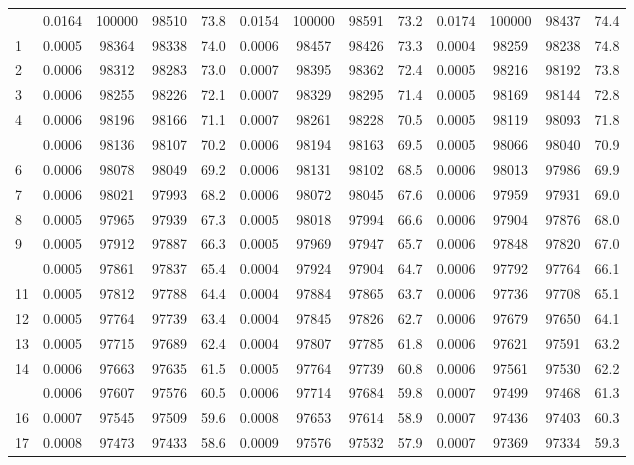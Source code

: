 \documentclass[
  14pt,
]{article}
\begin{document}
\begin{longtable}[t]{lcccccccccccc}
\endfoot
\bottomrule
\endlastfoot
0 & 0.0164 & 100000 & 98510 & 73.8 & 0.0154 & 100000 & 98591 & 73.2 & 0.0174 & 100000 & 98437 & 74.4\\
1 & 0.0005 & 98364 & 98338 & 74.0 & 0.0006 & 98457 & 98426 & 73.3 & 0.0004 & 98259 & 98238 & 74.8\\
2 & 0.0006 & 98312 & 98283 & 73.0 & 0.0007 & 98395 & 98362 & 72.4 & 0.0005 & 98216 & 98192 & 73.8\\
3 & 0.0006 & 98255 & 98226 & 72.1 & 0.0007 & 98329 & 98295 & 71.4 & 0.0005 & 98169 & 98144 & 72.8\\
4 & 0.0006 & 98196 & 98166 & 71.1 & 0.0007 & 98261 & 98228 & 70.5 & 0.0005 & 98119 & 98093 & 71.8\\
\addlinespace
5 & 0.0006 & 98136 & 98107 & 70.2 & 0.0006 & 98194 & 98163 & 69.5 & 0.0005 & 98066 & 98040 & 70.9\\
6 & 0.0006 & 98078 & 98049 & 69.2 & 0.0006 & 98131 & 98102 & 68.5 & 0.0006 & 98013 & 97986 & 69.9\\
7 & 0.0006 & 98021 & 97993 & 68.2 & 0.0006 & 98072 & 98045 & 67.6 & 0.0006 & 97959 & 97931 & 69.0\\
8 & 0.0005 & 97965 & 97939 & 67.3 & 0.0005 & 98018 & 97994 & 66.6 & 0.0006 & 97904 & 97876 & 68.0\\
9 & 0.0005 & 97912 & 97887 & 66.3 & 0.0005 & 97969 & 97947 & 65.7 & 0.0006 & 97848 & 97820 & 67.0\\
\addlinespace
10 & 0.0005 & 97861 & 97837 & 65.4 & 0.0004 & 97924 & 97904 & 64.7 & 0.0006 & 97792 & 97764 & 66.1\\
11 & 0.0005 & 97812 & 97788 & 64.4 & 0.0004 & 97884 & 97865 & 63.7 & 0.0006 & 97736 & 97708 & 65.1\\
12 & 0.0005 & 97764 & 97739 & 63.4 & 0.0004 & 97845 & 97826 & 62.7 & 0.0006 & 97679 & 97650 & 64.1\\
13 & 0.0005 & 97715 & 97689 & 62.4 & 0.0004 & 97807 & 97785 & 61.8 & 0.0006 & 97621 & 97591 & 63.2\\
14 & 0.0006 & 97663 & 97635 & 61.5 & 0.0005 & 97764 & 97739 & 60.8 & 0.0006 & 97561 & 97530 & 62.2\\
\addlinespace
15 & 0.0006 & 97607 & 97576 & 60.5 & 0.0006 & 97714 & 97684 & 59.8 & 0.0007 & 97499 & 97468 & 61.3\\
16 & 0.0007 & 97545 & 97509 & 59.6 & 0.0008 & 97653 & 97614 & 58.9 & 0.0007 & 97436 & 97403 & 60.3\\
17 & 0.0008 & 97473 & 97433 & 58.6 & 0.0009 & 97576 & 97532 & 57.9 & 0.0007 & 97369 & 97334 & 59.3\\

\end{longtable}
\end{document}
